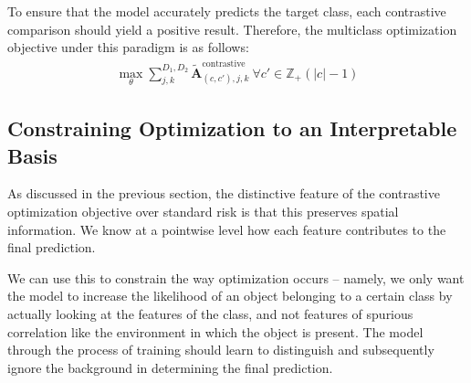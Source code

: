 \documentclass{article}
\begin{document}
To ensure that the model accurately predicts the target class, each contrastive comparison should yield a positive result. Therefore, the multiclass optimization objective under this paradigm is as follows:
\begin{gather}
	\max_{\theta} \sum^{D_1,D_2}_{j,k}\tilde{\mathcal{\bm{A}}}_{(c, c'),j,k}^{\text{contrastive}}\ \forall c' \in \mathbb{Z}_{+}(|c| - 1)
\end{gather}

\subsection{Constraining Optimization to an Interpretable Basis}

As discussed in the previous section, the distinctive feature of the contrastive optimization objective over standard risk is that this preserves spatial information. We know at a pointwise level how each feature contributes to the final prediction.

We can use this to constrain the way optimization occurs -- namely, we only want the model to increase the likelihood of an object belonging to a certain class by actually looking at the features of the class, and not features of spurious correlation like the environment in which the object is present. The model through the process of training should learn to distinguish and subsequently ignore the background in determining the final prediction.
\end{document}
